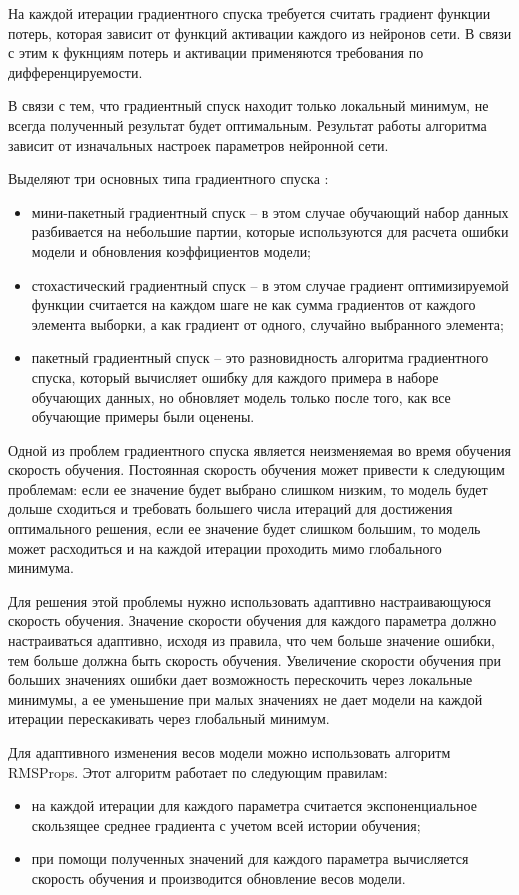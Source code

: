 На каждой итерации градиентного спуска требуется считать градиент функции потерь, которая зависит от функций активации каждого из нейронов сети. 
В связи с этим к фукнциям потерь и активации применяются требования по дифференцируемости.

В связи с тем, что градиентный спуск находит только локальный минимум, не всегда полученный результат будет оптимальным. 
Результат работы алгоритма зависит от изначальных настроек параметров нейронной сети.

Выделяют три основных типа градиентного спуска \cite{gradient}:
\begin{itemize}
	\item мини-пакетный градиентный спуск -- в этом случае обучающий набор данных разбивается на небольшие партии, которые используются для расчета ошибки модели и обновления коэффициентов модели;
	\item стохастический градиентный спуск -- в этом случае градиент оптимизируемой функции считается на каждом шаге не как сумма градиентов от каждого элемента выборки, а как градиент от одного, случайно выбранного элемента;
	\item пакетный градиентный спуск -- это разновидность
	алгоритма градиентного спуска, который вычисляет ошибку для	каждого примера в наборе обучающих данных, но обновляет модель только после того, как все обучающие примеры были оценены.
\end{itemize}

Одной из проблем градиентного спуска является неизменяемая во время обучения скорость обучения. 
Постоянная скорость обучения может привести к следующим проблемам: если ее значение будет выбрано слишком низким, то модель будет дольше сходиться и требовать большего числа итераций для достижения оптимального решения, если ее значение будет слишком большим, то модель может расходиться и на каждой итерации проходить мимо глобального минимума.

Для решения этой проблемы нужно использовать адаптивно настраивающуюся скорость обучения.
Значение скорости обучения для каждого параметра должно настраиваться адаптивно, исходя из правила, что чем больше значение ошибки, тем больше должна быть скорость обучения. 
Увеличение скорости обучения при больших значениях ошибки дает возможность перескочить через локальные минимумы, а ее уменьшение при малых значениях не дает модели на каждой итерации перескакивать через глобальный минимум.

Для адаптивного изменения весов модели можно использовать алгоритм RMSProps. Этот алгоритм работает по следующим правилам:
\begin{itemize}
	\item на каждой итерации для каждого параметра считается экспоненциальное скользящее среднее градиента с учетом всей истории обучения;
	\item при помощи полученных значений для каждого параметра вычисляется скорость обучения и производится обновление весов модели.
\end{itemize}

